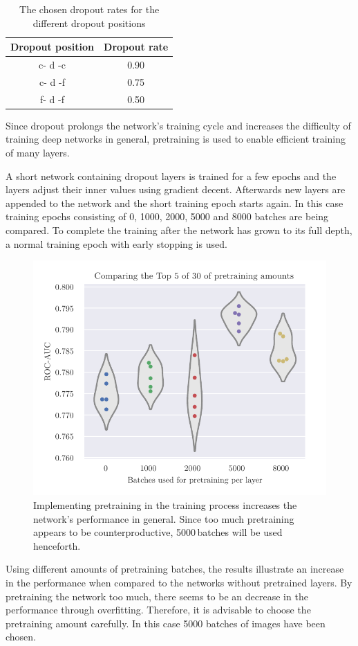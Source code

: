 \begin{table}
    \centering
    \caption{The chosen dropout rates for the different dropout positions}
    \label{tab:dropout_rates}
    \begin{tabular}{cc}
        \toprule
        {Dropout position}  & {Dropout rate} \\
        \midrule
        c- d -c & 0.90 \\
        c- d -f & 0.75 \\
        f- d -f & 0.50 \\
        \bottomrule
    \end{tabular}
\end{table}

Since dropout prolongs the network's training cycle and increases the difficulty of training deep networks in general,
pretraining is used to enable efficient training of many layers.

A short network containing dropout layers is trained for a few epochs
and the layers adjust their inner values using gradient decent.
Afterwards new layers are appended to the network and the short training epoch starts again.
In this case training epochs consisting of \num{0}, \num{1000}, \num{2000}, \num{5000} and \num{8000} batches are being compared.
To complete the training after the network has grown to its full depth, a normal training epoch with early stopping is used.

\begin{figure}
    \centering
    \includegraphics[scale=1]{Plots/Pretraining_Amounts.pdf}
    \caption{Implementing pretraining in the training process increases the network's performance in general. Since too much pretraining appears to be counterproductive, \num{5000}\,batches will be used henceforth.}
    \label{fig:pretraining_amounts}
\end{figure}

Using different amounts of pretraining batches, the results illustrate an increase in the performance
when compared to the networks without pretrained layers.
By pretraining the network too much, there seems to be an decrease in the performance through overfitting.
Therefore, it is advisable to choose the pretraining amount carefully.
In this case \num{5000} batches of images have been chosen.
